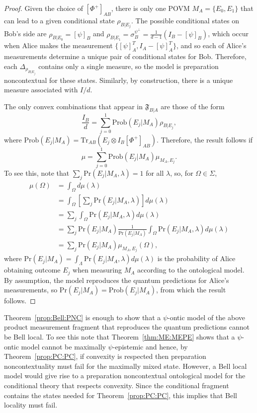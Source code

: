 \documentclass[DIV=calc,paper=a4,fontsize=11pt,twocolumn]{scrartcl} %
\theoremstyle{definition}
\theoremstyle{plain}
\newcommand{\Proj}[1]{\ensuremath{\left [ #1 \right ]}}
\newcommand{\Tr}[2][]{\ensuremath{\text{Tr}_{#1} \left ( #2 \right )}}
\begin{document}
\begin{proof}
Given the choice of $\Proj{\Phi^+}_{AB}$, there is only one POVM
$M_A = \{E_0,E_1\}$ that can lead to a given conditional state
$\rho_{B|E_j}$.  The possible conditional states on Bob's side are
$\rho_{B|E_0} = \Proj{\psi}_B$ and $\rho_{B|E_1} =
\sigma^{\psi^{\perp}}_B = \frac{1}{d-1}(I_B - \Proj{\psi}_B)$, which
occur when Alice makes the measurement $\{\Proj{\psi}^T_A, I_A -
\Proj{\psi}^T_A\}$, and so each of Alice's measurements determine a
unique pair of conditional states for Bob.  Therefore, each
$\Delta_{\rho_{B|E_j}}$ contains only a single measure, so the model
is preparation noncontextual for these states.  Similarly, by
construction, there is a unique measure associated with $I/d$.

The only convex combinations that appear in $\mathfrak{F}_{B|A}$ are
those of the form
\begin{equation}
\frac{I_B}{d} = \sum_{j =0}^1 \text{Prob}(E_j|M_A) \rho_{B|E_j},
\end{equation}
where $\text{Prob}(E_j|M_A) = \Tr[AB]{E_j \otimes I_B
\Proj{\Phi^+}_{AB}}$.  Therefore, the result follows if
\begin{equation}
\mu = \sum_{j=0}^1 \text{Prob}(E_j|M_A) \mu_{M_A,E_j}.
\end{equation}
To see this, note that $\sum_j \text{Pr}(E_j|M_A,\lambda) = 1$ for all
$\lambda$, so, for $\Omega \in \Sigma$,
\begin{align}
\mu(\Omega) & = \int_{\Omega} d\mu(\lambda) \\
& = \int_{\Omega} \left [ \sum_j \text{Pr}(E_j|M_A,\lambda) \right
] d\mu(\lambda) \\
& = \sum_j \int_{\Omega} \text{Pr}(E_j|M_A,\lambda) d\mu(\lambda)
\\
& = \sum_j \text{Pr}(E_j|M_A)
\frac{1}{\text{Pr}(E_j|M_A)} \int_{\Omega}
\text{Pr}(E_j|M_A,\lambda) d\mu(\lambda) \\
& = \sum_j \text{Pr}(E_j|M_A) \mu_{M_A,E_j}(\Omega),
\end{align}
where $\text{Pr}(E_j|M_A) = \int_{\Lambda}
\text{Pr}(E_j|M_A,\lambda)d\mu(\lambda)$ is the probability of Alice
obtaining outcome $E_j$ when measuring $M_A$ according to the
ontological model.  By assumption, the model reproduces the quantum
predictions for Alice's measurements, so $\text{Pr}(E_j|M_A) =
\text{Prob}(E_j|M_A)$, from which the result follows.
\end{proof}

Theorem~\ref{prop:Bell:PNC} is enough to show that a $\psi$-ontic
model of the above product measurement fragment that reproduces the
quantum predictions cannot be Bell local.  To see this note that
Theorem~\ref{thm:ME:MEPE} shows that a $\psi$-ontic model cannot be
maximally $\psi$-epistemic and hence, by Theorem~\ref{prop:PC:PC}, if
convexity is respected then preparation noncontextuality must fail for
the maximally mixed state.  However, a Bell local model would give
rise to a preparation noncontextual ontological model for the
conditional theory that respects convexity.  Since the conditional
fragment contains the states needed for Theorem~\ref{prop:PC:PC}, this
implies that Bell locality must fail.
\end{document}
